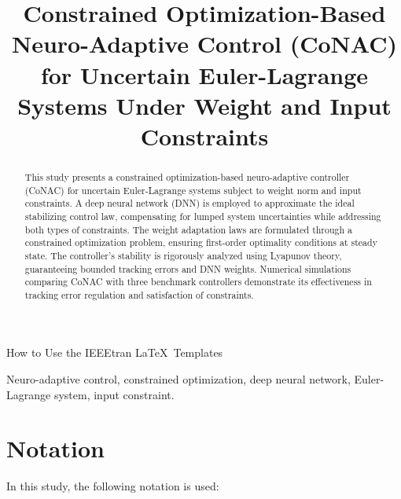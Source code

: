 \documentclass[lettersize,journal]{IEEEtran}
\begin{document}
\title{
Constrained Optimization-Based Neuro-Adaptive Control (CoNAC) for Uncertain Euler-Lagrange Systems Under Weight and Input Constraints 
}

%
{How to Use the IEEEtran \LaTeX \ Templates}

\maketitle

\begin{abstract}
    This study presents a constrained optimization-based neuro-adaptive controller (CoNAC) for uncertain Euler-Lagrange systems subject to weight norm and input constraints. A deep neural network (DNN) is employed to approximate the ideal stabilizing control law, compensating for lumped system uncertainties while addressing both types of constraints. The weight adaptation laws are formulated through a constrained optimization problem, ensuring first-order optimality conditions at steady state. The controller's stability is rigorously analyzed using Lyapunov theory, guaranteeing bounded tracking errors and DNN weights. Numerical simulations comparing CoNAC with three benchmark controllers demonstrate its effectiveness in tracking error regulation and satisfaction of constraints.
\end{abstract}

\begin{IEEEkeywords}
Neuro-adaptive control, constrained optimization, deep neural network, Euler-Lagrange system, input constraint.
\end{IEEEkeywords}


\section*{Notation}
In this study, the following notation is used:
\end{document}
